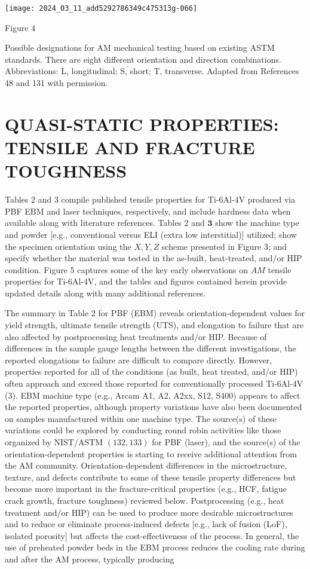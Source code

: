 \documentclass[10pt]{article}
\begin{document}
\begin{center}
\texttt{[image: 2024\_03\_11\_add5292786349c475313g-066]}
\end{center}

Figure 4

Possible designations for AM mechanical testing based on existing ASTM standards. There are eight different orientation and direction combinations. Abbreviations: L, longitudinal; S, short; T, transverse. Adapted from References 48 and 131 with permission.

\section*{QUASI-STATIC PROPERTIES: TENSILE AND FRACTURE TOUGHNESS}
Tables 2 and 3 compile published tensile properties for Ti-6Al-4V produced via PBF EBM and laser techniques, respectively, and include hardness data when available along with literature references. Tables 2 and $\mathbf{3}$ show the machine type and powder [e.g., conventional versus ELI (extra low interstitial)] utilized; show the specimen orientation using the $X, Y, Z$ scheme presented in Figure 3; and specify whether the material was tested in the as-built, heat-treated, and/or HIP condition. Figure 5 captures some of the key early observations on $A M$ tensile properties for Ti-6Al-4V, and the tables and figures contained herein provide updated details along with many additional references.

The summary in Table 2 for PBF (EBM) reveals orientation-dependent values for yield strength, ultimate tensile strength (UTS), and elongation to failure that are also affected by postprocessing heat treatments and/or HIP. Because of differences in the sample gauge lengths between the different investigations, the reported elongations to failure are difficult to compare directly. However, properties reported for all of the conditions (as built, heat treated, and/or HIP) often approach and exceed those reported for conventionally processed Ti-6Al-4V (3). EBM machine type (e.g., Arcam A1, A2, A2xx, S12, S400) appears to affect the reported properties, although property variations have also been documented on samples manufactured within one machine type. The source(s) of these variations could be explored by conducting round robin activities like those organized by NIST/ASTM $(132,133)$ for PBF (laser), and the source(s) of the orientation-dependent properties is starting to receive additional attention from the AM community. Orientation-dependent differences in the microstructure, texture, and defects contribute to some of these tensile property differences but become more important in the fracture-critical properties (e.g., HCF, fatigue crack growth, fracture toughness) reviewed below. Postprocessing (e.g., heat treatment and/or HIP) can be used to produce more desirable microstructures and to reduce or eliminate process-induced defects [e.g., lack of fusion (LoF), isolated porosity] but affects the cost-effectiveness of the process. In general, the use of preheated powder beds in the EBM process reduces the cooling rate during and after the AM process, typically producing
\end{document}
